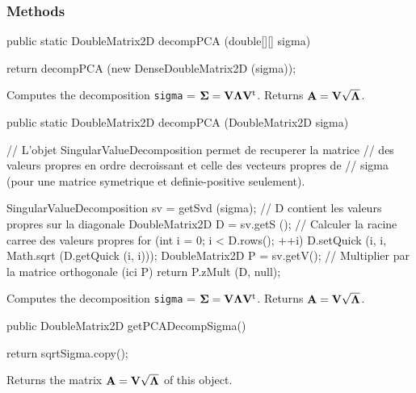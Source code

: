 \subsubsection* {Methods}
\begin{code}
   public static DoubleMatrix2D decompPCA (double[][] sigma) \begin{hide}  {
      return decompPCA (new DenseDoubleMatrix2D (sigma));
   }\end{hide}
\end{code}
\begin{tabb} Computes the decomposition \texttt{sigma} =
$\boldsymbol{\Sigma} = \mathbf{V}\boldsymbol{\Lambda}\mathbf{V}^{\mathsf{t}}$. Returns $\textbf{A} = \mathbf{V}\sqrt{\boldsymbol{\Lambda}}$.
\end{tabb}
\begin{code}

   public static DoubleMatrix2D decompPCA (DoubleMatrix2D sigma) \begin{hide}  {
      // L'objet SingularValueDecomposition permet de recuperer la matrice
      // des valeurs propres en ordre decroissant et celle des vecteurs propres de
      // sigma (pour une matrice symetrique et definie-positive seulement).

      SingularValueDecomposition sv = getSvd (sigma);
      // D contient les valeurs propres sur la diagonale
      DoubleMatrix2D D = sv.getS ();
      // Calculer la racine carree des valeurs propres
      for (int i = 0; i < D.rows(); ++i)
         D.setQuick (i, i, Math.sqrt (D.getQuick (i, i)));
      DoubleMatrix2D P = sv.getV();
      // Multiplier par la matrice orthogonale (ici P)
      return P.zMult (D, null);
   }\end{hide}
\end{code}
\begin{tabb} Computes the decomposition \texttt{sigma} = $\boldsymbol{\Sigma} =
 \mathbf{V}\boldsymbol{\Lambda}\mathbf{V}^{\mathsf{t}}$. Returns $\textbf{A} = \mathbf{V}\sqrt{\boldsymbol{\Lambda}}$.
\end{tabb}
\begin{code}

   public DoubleMatrix2D getPCADecompSigma()\begin{hide} {
      return sqrtSigma.copy();
   }\end{hide}
\end{code}
\begin{tabb} Returns the matrix $\textbf{A} = \mathbf{V}\sqrt{\boldsymbol{\Lambda}}$ of this object.
\end{tabb}
\begin{htmlonly}
\end{htmlonly}
